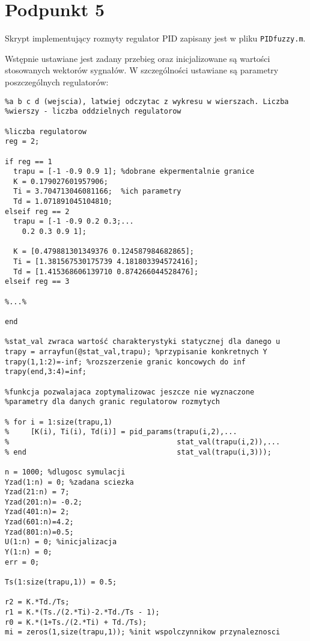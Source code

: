 \chapter{Podpunkt 5}

Skrypt implementujący rozmyty regulator PID zapisany jest w pliku \verb|PIDfuzzy.m|.

Wstępnie ustawiane jest zadany przebieg oraz inicjalizowane są wartości stosowanych wektorów sygnałów. W szczególności ustawiane są parametry poszczególnych regulatorów:

\begin{lstlisting}[style=Matlab-editor]
%trapu - parametry trapezoidalnych funkcji przynaleznosci, kolejno 
%a b c d (wejscia), latwiej odczytac z wykresu w wierszach. Liczba 
%wierszy - liczba oddzielnych regulatorow

%liczba regulatorow
reg = 2;

if reg == 1
  trapu = [-1 -0.9 0.9 1]; %dobrane ekpermentalnie granice
  K = 0.179027601957906;   
  Ti = 3.704713046081166;  %ich parametry
  Td = 1.071891045104810;
elseif reg == 2
  trapu = [-1 -0.9 0.2 0.3;...
    0.2 0.3 0.9 1];

  K = [0.479881301349376 0.124587984682865];
  Ti = [1.381567530175739 4.181803394572416];
  Td = [1.415368606139710 0.874266044528476];
elseif reg == 3

%...%

end

%stat_val zwraca wartość charakterystyki statycznej dla danego u
trapy = arrayfun(@stat_val,trapu); %przypisanie konkretnych Y
trapy(1,1:2)=-inf; %rozszerzenie granic koncowych do inf
trapy(end,3:4)=inf;

%funkcja pozwalajaca zoptymalizowac jeszcze nie wyznaczone
%parametry dla danych granic regulatorow rozmytych

% for i = 1:size(trapu,1)
%     [K(i), Ti(i), Td(i)] = pid_params(trapu(i,2),...
%                                       stat_val(trapu(i,2)),...
% end                                   stat_val(trapu(i,3)));

n = 1000; %dlugosc symulacji
Yzad(1:n) = 0; %zadana sciezka
Yzad(21:n) = 7;
Yzad(201:n)= -0.2;
Yzad(401:n)= 2;
Yzad(601:n)=4.2;
Yzad(801:n)=0.5;
U(1:n) = 0; %inicjalizacja
Y(1:n) = 0;
err = 0;

Ts(1:size(trapu,1)) = 0.5;

r2 = K.*Td./Ts; 
r1 = K.*(Ts./(2.*Ti)-2.*Td./Ts - 1);
r0 = K.*(1+Ts./(2.*Ti) + Td./Ts);
mi = zeros(1,size(trapu,1)); %init wspolczynnikow przynaleznosci
\end{lstlisting}

